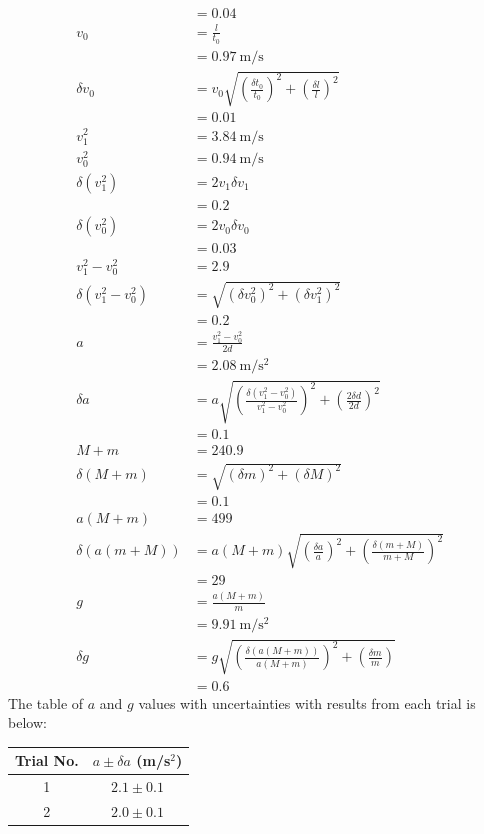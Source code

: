 \documentclass[10pt]{extarticle}
\newcommand{\plain}[1]{\textrm{#1}}
\begin{document}
{\begin{align*}
	&= 0.04 \\
	v_0 &= \frac{l}{t_0} \\
	&= 0.97~\plain{m/s} \\
	\delta v_0 &= v_0\sqrt{\left(\frac{\delta t_0}{t_0}\right)^2 + \left(\frac{\delta l}{l}\right)^2} \\
	&= 0.01 \\
	v_1^2 &= 3.84~\plain{m/s} \\
	v_0^2 &= 0.94~\plain{m/s} \\
	\delta \left(v_1^2\right) &= 2v_1\delta v_1 \\
	&= 0.2 \\
	\delta \left(v_0^2\right) &= 2v_0\delta v_0 \\
	&= 0.03 \\
	v_1^2-v_0^2 &= 2.9 \\
	\delta(v_1^2-v_0^2) &= \sqrt{\left(\delta v_0^2\right)^2 + \left(\delta v_1^2\right)^2} \\
	&= 0.2 \\
	a &= \frac{v_1^2-v_0^2}{2d} \\
	&= 2.08~\plain{m/s$^2$} \\
	\delta a &= a\sqrt{\left(\frac{\delta(v_1^2-v_0^2)}{v_1^2-v_0^2}\right)^2 + \left(\frac{2\delta d}{2d}\right)^2} \\
	&= 0.1 \\
	M+m &= 240.9 \\
	\delta (M+m) &= \sqrt{(\delta m)^2 + (\delta M)^2} \\
	&= 0.1 \\
	a(M+m) &= 499 \\
	\delta(a(m+M)) &= a(M+m)\sqrt{\left(\frac{\delta a}{a}\right)^2 + \left(\frac{\delta(m+M)}{m+M}\right)^2} \\
	&= 29 \\
	g &= \frac{a(M+m)}{m} \\
	&= 9.91~\plain{m/s$^2$} \\
	\delta g &= g\sqrt{\left(\frac{\delta(a(M+m))}{a(M+m)}\right)^2 + \left(\frac{\delta m}{m}\right)} \\
	&= 0.6
 \end{align*}
The table of $a$ and $g$ values with uncertainties with results from each trial is below:
\begin{center}
	\begin{tabular}{c|c}
		Trial No. & $a \pm \delta a$ (m/s$^2$) \\
		\hline
		1 & $2.1 \pm 0.1$ \\
		2 & $2.0 \pm 0.1$ \\

\end{tabular}
\end{center}}
\end{document}
